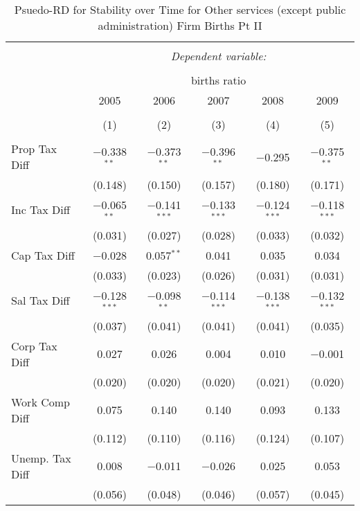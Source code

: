 
\begin{table}[!htbp] \centering 
  \caption{Psuedo-RD for Stability over Time for  Other services (except public administration) Firm Births Pt II} 
  \label{81year} 
\small 
\begin{tabular}{@{\extracolsep{5pt}}lccccc} 
\\[-1.8ex]\hline 
\hline \\[-1.8ex] 
 & \multicolumn{5}{c}{\textit{Dependent variable:}} \\ 
\cline{2-6} 
\\[-1.8ex] & \multicolumn{5}{c}{births ratio} \\ 
 & 2005 & 2006 & 2007 & 2008 & 2009 \\ 
\\[-1.8ex] & (1) & (2) & (3) & (4) & (5)\\ 
\hline \\[-1.8ex] 
 Prop Tax Diff & $-$0.338$^{**}$ & $-$0.373$^{**}$ & $-$0.396$^{**}$ & $-$0.295 & $-$0.375$^{**}$ \\ 
  & (0.148) & (0.150) & (0.157) & (0.180) & (0.171) \\ 
  Inc Tax Diff & $-$0.065$^{**}$ & $-$0.141$^{***}$ & $-$0.133$^{***}$ & $-$0.124$^{***}$ & $-$0.118$^{***}$ \\ 
  & (0.031) & (0.027) & (0.028) & (0.033) & (0.032) \\ 
  Cap Tax Diff & $-$0.028 & 0.057$^{**}$ & 0.041 & 0.035 & 0.034 \\ 
  & (0.033) & (0.023) & (0.026) & (0.031) & (0.031) \\ 
  Sal Tax Diff & $-$0.128$^{***}$ & $-$0.098$^{**}$ & $-$0.114$^{***}$ & $-$0.138$^{***}$ & $-$0.132$^{***}$ \\ 
  & (0.037) & (0.041) & (0.041) & (0.041) & (0.035) \\ 
  Corp Tax Diff & 0.027 & 0.026 & 0.004 & 0.010 & $-$0.001 \\ 
  & (0.020) & (0.020) & (0.020) & (0.021) & (0.020) \\ 
  Work Comp Diff & 0.075 & 0.140 & 0.140 & 0.093 & 0.133 \\ 
  & (0.112) & (0.110) & (0.116) & (0.124) & (0.107) \\ 
  Unemp. Tax Diff & 0.008 & $-$0.011 & $-$0.026 & 0.025 & 0.053 \\ 
  & (0.056) & (0.048) & (0.046) & (0.057) & (0.045) \\ 

\end{tabular}
\end{table}
